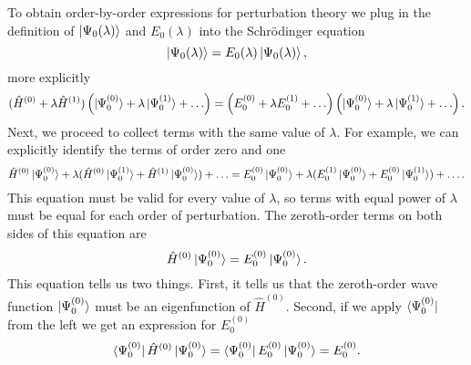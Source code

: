 \documentclass[../Main/chem532-notes.tex]{subfiles}
\begin{document}
To obtain order-by-order expressions for perturbation theory we plug in the definition of $\ket{\Psi_0(\lambda)}$ and $E_0(\lambda)$ into the Schr\"{o}dinger equation
\begin{equation}
[\hat{H}^{(0)} + \lambda \hat{H}^{(1)}] \ket{\Psi_0(\lambda)} = E_0(\lambda) \ket{\Psi_0(\lambda)},
\end{equation}
more explicitly
\begin{equation}
(\hat{H}^{(0)} + \lambda \hat{H}^{(1)})
\left(
\ket{\Psi_0^{(0)}}
+ \lambda \ket{\Psi_0^{(1)}}  + \ldots 
\right)
= \left( E_0^{(0)}
+ \lambda E_0^{(1)} + \ldots\right)
\left(
\ket{\Psi_0^{(0)}}
+ \lambda \ket{\Psi_0^{(1)}} +  \ldots 
\right).
\end{equation}
Next, we proceed to collect terms with the same value of $\lambda$. For example, we can explicitly identify the terms of order zero and one
\begin{equation}
\hat{H}^{(0)} \ket{\Psi_0^{(0)}} + \lambda (\hat{H}^{(0)}\ket{\Psi_0^{(1)}} + \hat{H}^{(1)}\ket{\Psi_0^{(0)}}) + \ldots = E_0^{(0)}\ket{\Psi_0^{(0)}} + \lambda (E_0^{(1)}\ket{\Psi_0^{(0)}} + E_0^{(0)}\ket{\Psi_0^{(1)}}) + \ldots.
\end{equation}
This equation must be valid for every value of $\lambda$, so terms with equal power of $\lambda$ must be equal for each order of perturbation.
The zeroth-order terms on both sides of this equation are
\begin{equation}
\hat{H}^{(0)} \ket{\Psi_0^{(0)}} = E_0^{(0)}\ket{\Psi_0^{(0)}}.
\end{equation}
This equation tells us two things. First, it tells us that the zeroth-order wave function $\ket{\Psi_0^{(0)}}$ must be an eigenfunction of $\hat{H}^{(0)}$.
Second, if we apply $\bra{\Psi_0^{(0)}}$ from the left we get an expression for $E_0^{(0)}$
\begin{equation}
\bra{\Psi_0^{(0)}}\hat{H}^{(0)} \ket{\Psi_0^{(0)}} = \bra{\Psi_0^{(0)}}E_0^{(0)}\ket{\Psi_0^{(0)}} =E_0^{(0)}.
\end{equation}
\end{document}
